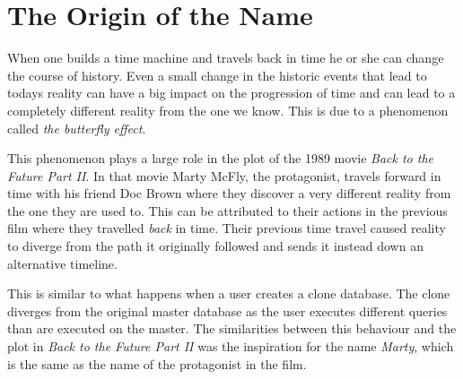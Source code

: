 \chapter{The Origin of the Name}
\label{ch:appendix-name}
When one builds a time machine and travels back in time he or she can change the course of history.
Even a small change in the historic events that lead to todays reality can have a big impact on the progression of time and can lead to a completely different reality from the one we know.
This is due to a phenomenon called \textit{the butterfly effect}.

This phenomenon plays a large role in the plot of the 1989 movie \textit{Back to the Future Part II}.
In that movie Marty McFly, the protagonist, travels forward in time with his friend Doc Brown where they discover a very different reality from the one they are used to.
This can be attributed to their actions in the previous film where they travelled \textit{back} in time.
Their previous time travel caused reality to diverge from the path it originally followed and sends it instead down an alternative timeline.

This is similar to what happens when a user creates a clone database.
The clone diverges from the original master database as the user executes different queries than are executed on the master.
The similarities between this behaviour and the plot in \textit{Back to the Future Part II} was the inspiration for the name \textit{Marty}, which is the same as the name of the protagonist in the film.